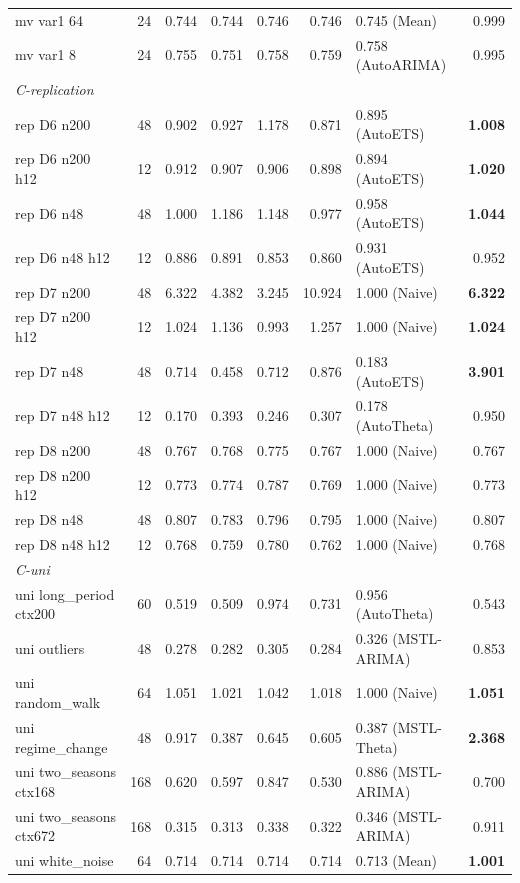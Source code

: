 \begin{tabular}{lrrrrrlr}
mv var1 64 & 24 & 0.744 & 0.744 & 0.746 & 0.746 & 0.745 (Mean) & 0.999 \\
mv var1 8 & 24 & 0.755 & 0.751 & 0.758 & 0.759 & 0.758 (AutoARIMA) & 0.995 \\
\midrule
\multicolumn{8}{l}{\textit{C-replication}} \\
rep D6 n200 & 48 & 0.902 & 0.927 & 1.178 & 0.871 & 0.895 (AutoETS) & \textbf{1.008} \\
rep D6 n200 h12 & 12 & 0.912 & 0.907 & 0.906 & 0.898 & 0.894 (AutoETS) & \textbf{1.020} \\
rep D6 n48 & 48 & 1.000 & 1.186 & 1.148 & 0.977 & 0.958 (AutoETS) & \textbf{1.044} \\
rep D6 n48 h12 & 12 & 0.886 & 0.891 & 0.853 & 0.860 & 0.931 (AutoETS) & 0.952 \\
rep D7 n200 & 48 & 6.322 & 4.382 & 3.245 & 10.924 & 1.000 (Naive) & \textbf{6.322} \\
rep D7 n200 h12 & 12 & 1.024 & 1.136 & 0.993 & 1.257 & 1.000 (Naive) & \textbf{1.024} \\
rep D7 n48 & 48 & 0.714 & 0.458 & 0.712 & 0.876 & 0.183 (AutoETS) & \textbf{3.901} \\
rep D7 n48 h12 & 12 & 0.170 & 0.393 & 0.246 & 0.307 & 0.178 (AutoTheta) & 0.950 \\
rep D8 n200 & 48 & 0.767 & 0.768 & 0.775 & 0.767 & 1.000 (Naive) & 0.767 \\
rep D8 n200 h12 & 12 & 0.773 & 0.774 & 0.787 & 0.769 & 1.000 (Naive) & 0.773 \\
rep D8 n48 & 48 & 0.807 & 0.783 & 0.796 & 0.795 & 1.000 (Naive) & 0.807 \\
rep D8 n48 h12 & 12 & 0.768 & 0.759 & 0.780 & 0.762 & 1.000 (Naive) & 0.768 \\
\midrule
\multicolumn{8}{l}{\textit{C-uni}} \\
uni long\_period ctx200 & 60 & 0.519 & 0.509 & 0.974 & 0.731 & 0.956 (AutoTheta) & 0.543 \\
uni outliers & 48 & 0.278 & 0.282 & 0.305 & 0.284 & 0.326 (MSTL-ARIMA) & 0.853 \\
uni random\_walk & 64 & 1.051 & 1.021 & 1.042 & 1.018 & 1.000 (Naive) & \textbf{1.051} \\
uni regime\_change & 48 & 0.917 & 0.387 & 0.645 & 0.605 & 0.387 (MSTL-Theta) & \textbf{2.368} \\
uni two\_seasons ctx168 & 168 & 0.620 & 0.597 & 0.847 & 0.530 & 0.886 (MSTL-ARIMA) & 0.700 \\
uni two\_seasons ctx672 & 168 & 0.315 & 0.313 & 0.338 & 0.322 & 0.346 (MSTL-ARIMA) & 0.911 \\
uni white\_noise & 64 & 0.714 & 0.714 & 0.714 & 0.714 & 0.713 (Mean) & \textbf{1.001} \\
\bottomrule
\end{tabular}
